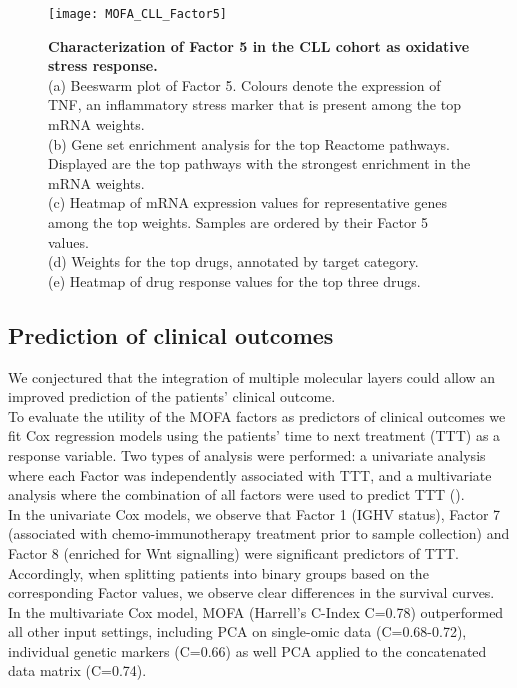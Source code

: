 \begin{figure}[H]
	\centering 	
	\texttt{[image: MOFA\_CLL\_Factor5]}
	\caption{
	\textbf{Characterization of Factor 5 in the CLL cohort as oxidative stress response.}\\
	(a) Beeswarm  plot of Factor 5. Colours denote the expression of TNF, an inflammatory stress marker that is present among the top mRNA weights.\\
	(b) Gene set enrichment analysis for the top Reactome pathways. Displayed are the top pathways with the strongest enrichment in the mRNA weights.\\
	(c) Heatmap of mRNA expression values for representative genes among the top  weights. Samples are ordered by their Factor 5 values.\\
	(d) Weights for the top drugs, annotated by target category.\\
	(e) Heatmap of drug response values for the top three drugs.
	}
	\label{fig:MOFA_CLL_Factor5}
\end{figure}


\subsection{Prediction of clinical outcomes}

We conjectured that the integration of multiple molecular layers could allow an improved prediction of the patients' clinical outcome.\\
To evaluate the utility of the MOFA factors as predictors of clinical outcomes we fit Cox regression models \cite{Cox1972} using the patients' time to next treatment (TTT) as a response variable. Two types of analysis were performed: a univariate analysis where each Factor was independently associated with TTT, and a multivariate analysis where the combination of all factors were used to predict TTT ().\\
In the univariate Cox models, we observe  that Factor 1 (IGHV status), Factor 7 (associated with chemo-immunotherapy treatment prior to sample collection) and Factor 8 (enriched for Wnt signalling) were significant predictors of TTT. Accordingly, when splitting patients into binary groups based on the corresponding Factor values, we observe clear differences in the survival curves.\\
In the multivariate Cox model, MOFA (Harrell's C-Index C=0.78) outperformed all other input settings, including PCA on single-omic data (C=0.68-0.72), individual genetic markers (C=0.66) as well PCA applied to the concatenated data matrix (C=0.74).

